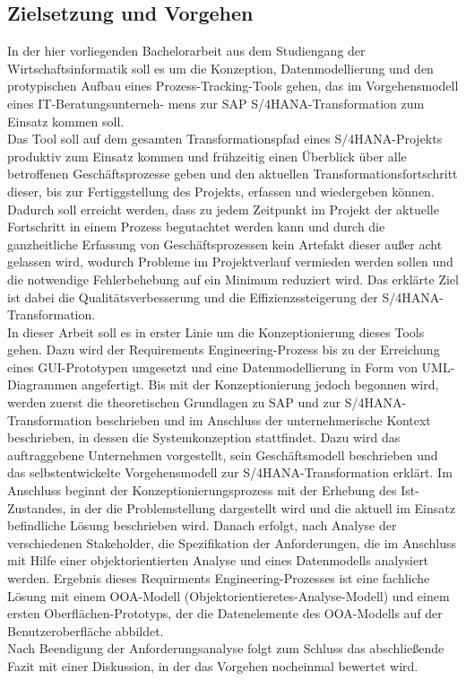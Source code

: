 \subsection{Zielsetzung und Vorgehen}
In der hier vorliegenden Bachelorarbeit aus dem Studiengang der Wirtschaftsinformatik soll es um die Konzeption, Datenmodellierung und den protypischen Aufbau eines Prozess-Tracking-Tools gehen, das im Vorgehensmodell eines IT-Beratungsunterneh- mens zur SAP S/4HANA-Transformation zum Einsatz kommen soll.\\ Das Tool soll auf dem gesamten Transformationspfad eines S/4HANA-Projekts produktiv zum Einsatz kommen und frühzeitig einen Überblick über alle betroffenen Geschäftsprozesse geben und den aktuellen Transformationsfortschritt dieser, bis zur Fertiggstellung des Projekts, erfassen und wiedergeben können. Dadurch soll erreicht werden, dass zu jedem Zeitpunkt im Projekt der aktuelle Fortschritt in einem Prozess begutachtet werden kann und durch die ganzheitliche Erfassung von Geschäftsprozessen kein Artefakt dieser außer acht gelassen wird, wodurch Probleme im Projektverlauf vermieden werden sollen und die notwendige Fehlerbehebung auf ein Minimum reduziert wird. Das erklärte Ziel ist dabei die Qualitätsverbesserung und die Effizienzssteigerung der S/4HANA-Transformation.\\
In dieser Arbeit soll es in erster Linie um die Konzeptionierung dieses Tools gehen. Dazu wird der Requirements Engineering-Prozess bis zu der Erreichung eines GUI-Prototypen umgesetzt und eine Datenmodellierung in Form von UML-Diagrammen angefertigt. Bis mit der Konzeptionierung jedoch begonnen wird, werden zuerst die theoretischen Grundlagen zu SAP und zur S/4HANA-Transformation beschrieben und im Anschluss der unternehmerische Kontext beschrieben, in dessen die Systemkonzeption stattfindet. Dazu wird das auftraggebene Unternehmen vorgestellt, sein Geschäftsmodell beschrieben und das selbstentwickelte Vorgehensmodell zur S/4HANA-Transformation erklärt. Im Anschluss beginnt der Konzeptionierungsprozess mit der Erhebung des Ist-Zustandes, in der die Problemstellung dargestellt wird und die aktuell im Einsatz befindliche Lösung beschrieben wird. Danach erfolgt, nach Analyse der verschiedenen Stakeholder, die Spezifikation der Anforderungen, die im Anschluss mit Hilfe einer objektorientierten Analyse und eines Datenmodells analysiert werden. Ergebnis dieses Requirments Engineering-Prozesses ist eine fachliche Lösung mit einem OOA-Modell (Objektorientieretes-Analyse-Modell) und einem ersten Oberflächen-Prototyps, der die Datenelemente des OOA-Modells auf der Benutzeroberfläche abbildet.\\Nach Beendigung der Anforderungsanalyse folgt zum Schluss das abschließende Fazit mit einer Diskussion, in der das Vorgehen nocheinmal bewertet wird. 

